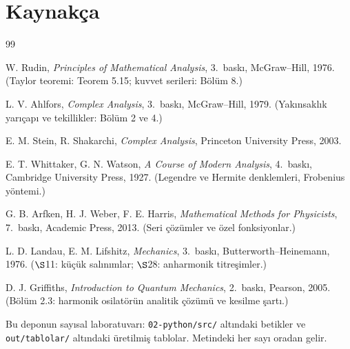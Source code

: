 \documentclass[11pt,a4paper]{article}
\theoremstyle{plain}
\theoremstyle{definition}
\theoremstyle{remark}
\begin{document}
\section*{Kaynakça}

\begin{thebibliography}{99}

W. Rudin, \emph{Principles of Mathematical Analysis}, 3.\ baskı,
McGraw--Hill, 1976. (Taylor teoremi: Teorem 5.15; kuvvet serileri: Bölüm 8.)

L. V. Ahlfors, \emph{Complex Analysis}, 3.\ baskı, McGraw--Hill, 1979.
(Yakınsaklık yarıçapı ve tekillikler: Bölüm 2 ve 4.)

E. M. Stein, R. Shakarchi, \emph{Complex Analysis}, Princeton University
Press, 2003.

E. T. Whittaker, G. N. Watson, \emph{A Course of Modern Analysis}, 4.\ baskı,
Cambridge University Press, 1927. (Legendre ve Hermite denklemleri,
Frobenius yöntemi.)

G. B. Arfken, H. J. Weber, F. E. Harris, \emph{Mathematical Methods for
Physicists}, 7.\ baskı, Academic Press, 2013. (Seri çözümler ve özel
fonksiyonlar.)

L. D. Landau, E. M. Lifshitz, \emph{Mechanics}, 3.\ baskı,
Butterworth--Heinemann, 1976. ($\S$11: küçük salınımlar; $\S$28:
anharmonik titreşimler.)

D. J. Griffiths, \emph{Introduction to Quantum Mechanics}, 2.\ baskı,
Pearson, 2005. (Bölüm 2.3: harmonik osilatörün analitik çözümü ve kesilme
şartı.)

Bu deponun sayısal laboratuvarı: \texttt{02-python/src/} altındaki betikler ve
\texttt{out/tablolar/} altındaki üretilmiş tablolar. Metindeki her sayı oradan
gelir.

\end{thebibliography}
\end{document}
